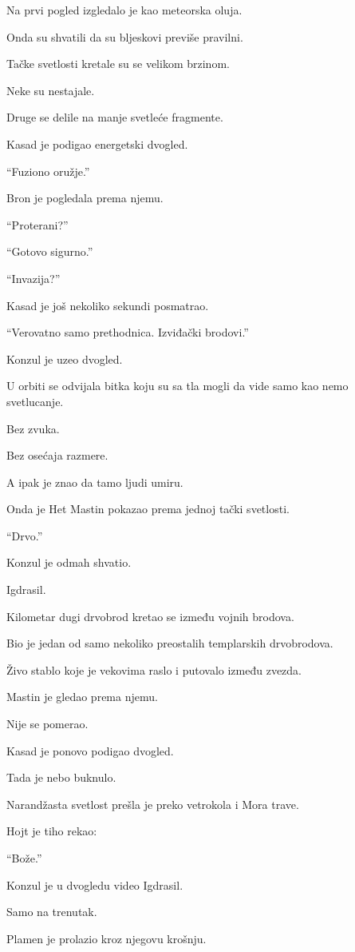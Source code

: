 Na prvi pogled izgledalo je kao meteorska oluja.

Onda su shvatili da su bljeskovi previše pravilni.

Tačke svetlosti kretale su se velikom brzinom.

Neke su nestajale.

Druge se delile na manje svetleće fragmente.

Kasad je podigao energetski dvogled.

``Fuziono oružje.''

Bron je pogledala prema njemu.

``Proterani?''

``Gotovo sigurno.''

``Invazija?''

Kasad je još nekoliko sekundi posmatrao.

``Verovatno samo prethodnica. Izviđački brodovi.''

Konzul je uzeo dvogled.

U orbiti se odvijala bitka koju su sa tla mogli da vide samo kao nemo svetlucanje.

Bez zvuka.

Bez osećaja razmere.

A ipak je znao da tamo ljudi umiru.

Onda je Het Mastin pokazao prema jednoj tački svetlosti.

``Drvo.''

Konzul je odmah shvatio.

Igdrasil.

\bigskip

Kilometar dugi drvobrod kretao se između vojnih brodova.

Bio je jedan od samo nekoliko preostalih templarskih drvobrodova.

Živo stablo koje je vekovima raslo i putovalo između zvezda.

Mastin je gledao prema njemu.

Nije se pomerao.

Kasad je ponovo podigao dvogled.

Tada je nebo buknulo.

Narandžasta svetlost prešla je preko vetrokola i Mora trave.

Hojt je tiho rekao:

``Bože.''

Konzul je u dvogledu video Igdrasil.

Samo na trenutak.

Plamen je prolazio kroz njegovu krošnju.


